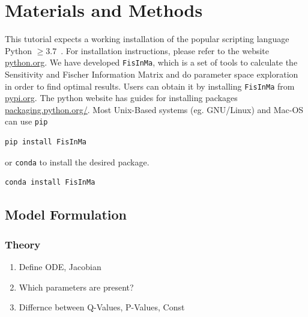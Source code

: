 \documentclass[10pt,A4paper]{article}
\begin{document}
%
%
%
\section*{Materials and Methods}
This tutorial expects a working installation of the popular scripting language Python $\geq3.7$~\cite{rossumPythonLanguageReference2010}.
For installation instructions, please refer to the website \href{https://www.python.org/downloads/}{python.org}.
We have developed \texttt{FisInMa}, which is a set of tools to calculate the Sensitivity and Fischer Information Matrix and do parameter space exploration in order to find optimal results.
Users can obtain it by installing \texttt{FisInMa} from \href{https://pypi.org/project/FisInMa/0.0.1/}{pypi.org}.
The python website has guides for installing packages \href{https://packaging.python.org/en/latest/tutorials/installing-packages/}{packaging.python.org/}.
Most Unix-Based systems (eg. GNU/Linux) and Mac-OS can use \texttt{pip}
\begin{verbatim}
pip install FisInMa
\end{verbatim}
or \texttt{conda} to install the desired package.
\begin{verbatim}
conda install FisInMa
\end{verbatim}
%
%
\subsection*{Model Formulation}
\subsubsection*{Theory}
\begin{enumerate}
    \item Define ODE, Jacobian
    \item Which parameters are present?
    \item Differnce between Q-Values, P-Values, Const
\end{enumerate}
\end{document}
